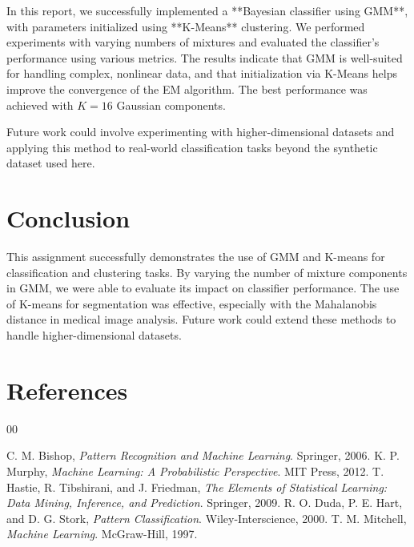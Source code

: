 \documentclass[conference]{IEEEtran}
\begin{document}
	In this report, we successfully implemented a **Bayesian classifier using GMM**, with parameters initialized using **K-Means** clustering. We performed experiments with varying numbers of mixtures and evaluated the classifier’s performance using various metrics. The results indicate that GMM is well-suited for handling complex, nonlinear data, and that initialization via K-Means helps improve the convergence of the EM algorithm. The best performance was achieved with \(K=16\) Gaussian components.
	
	Future work could involve experimenting with higher-dimensional datasets and applying this method to real-world classification tasks beyond the synthetic dataset used here.
	
	\section{Conclusion}
	
	This assignment successfully demonstrates the use of GMM and K-means for classification and clustering tasks. By varying the number of mixture components in GMM, we were able to evaluate its impact on classifier performance. The use of K-means for segmentation was effective, especially with the Mahalanobis distance in medical image analysis. Future work could extend these methods to handle higher-dimensional datasets.
	
	\section{References}
	
	\begin{thebibliography}{00}
		
		 C. M. Bishop, \textit{Pattern Recognition and Machine Learning}. Springer, 2006.
		 K. P. Murphy, \textit{Machine Learning: A Probabilistic Perspective}. MIT Press, 2012.
		 T. Hastie, R. Tibshirani, and J. Friedman, \textit{The Elements of Statistical Learning: Data Mining, Inference, and Prediction}. Springer, 2009.
		 R. O. Duda, P. E. Hart, and D. G. Stork, \textit{Pattern Classification}. Wiley-Interscience, 2000.
		 T. M. Mitchell, \textit{Machine Learning}. McGraw-Hill, 1997.
		
	\end{thebibliography}
	
	
\end{document}
